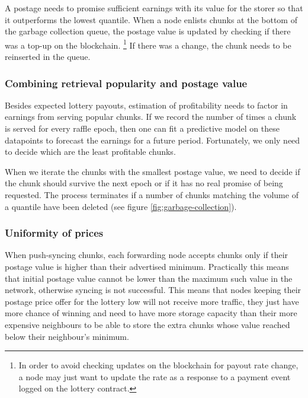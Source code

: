 A postage needs to promise sufficient earnings with its value for the storer so that it outperforms the lowest quantile. When a node enlists chunks at the bottom of the garbage collection queue, the postage value is updated by checking if there was a top-up on the blockchain.%
%
\footnote{In order to avoid checking updates on the blockchain for payout rate change, a node may just want to update the rate as a response to a payment event logged on the lottery contract.}
%
If there was a change, the chunk needs to be reinserted in the queue. 

\subsubsection{Combining retrieval popularity and postage value}

Besides expected lottery payouts, estimation of profitability needs to factor in earnings from serving popular chunks. If we record the number of times a chunk is served for every raffle epoch, then one can fit a predictive model on these datapoints to forecast the earnings for a future period. Fortunately, we only need to decide which are the least profitable chunks. 



When we iterate the chunks with the smallest postage value, we need to decide if the chunk should survive the next epoch or if it has no real promise of being requested. The process terminates if a number of chunks matching the volume of a quantile have been deleted (see figure \ref{fig:garbage-collection}).

\subsubsection{Uniformity of prices} 

When push-syncing chunks, each forwarding node accepts chunks only if their postage value is higher than their advertised minimum. Practically this means that initial postage value cannot be lower than the maximum such value in the network, otherwise syncing is not successful. This means that nodes keeping their postage price offer for the lottery low will not receive more traffic, they just have more chance of winning and need to have more storage capacity than their more expensive neighbours to be able to store the extra chunks whose value reached below their neighbour's minimum.

